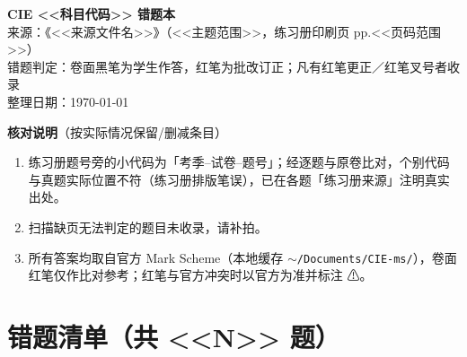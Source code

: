 \documentclass[10.5pt]{article}
\makeatletter
\newcommand{\qcard}[2]{%
\par\vspace{2.5mm}\noindent
\begin{tcolorbox}[enhanced,colback=white,colframe=mainc!60!black,boxrule=0.8pt,arc=1.5mm,
  title={\bfseries #1},colbacktitle=mainc!12,coltitle=mainc!60!black,fonttitle=\normalsize,
  left=2mm,right=2mm,top=1.2mm,bottom=1.2mm]
\begin{tabular}{@{}>{\bfseries\color{gray!55!black}}p{23mm} p{\dimexpr\linewidth-23mm-2\tabcolsep\relax}@{}}
#2
\end{tabular}
\end{tcolorbox}}
\newcommand{\row}[2]{\textbf{#1：} & #2 \\}
\makeatother
\begin{document}
\pagestyle{fancy}\fancyhf{}
\fancyfoot[C]{\small\thepage}
\renewcommand{\headrulewidth}{0.4pt}

\begin{center}
  {\LARGE\bfseries\color{mainc} CIE <<科目代码>> 错题本}\\[2mm]
  {\small 来源：《<<来源文件名>>》（<<主题范围>>，练习册印刷页 pp.<<页码范围>>）\\[1mm]
  错题判定：卷面黑笔为学生作答，红笔为批改订正；凡有红笔更正／红笔叉号者收录\\[1mm]
  整理日期：\today}
\end{center}

\vspace{1mm}
\begin{tcolorbox}[enhanced,colback=accc!5,colframe=accc!60,boxrule=0.7pt,arc=1.2mm,left=2.5mm,right=2.5mm]
\textbf{核对说明}（按实际情况保留/删减条目）
\begin{enumerate}
  \item 练习册题号旁的小代码为「考季--试卷--题号」；经逐题与原卷比对，个别代码与真题实际位置不符（练习册排版笔误），已在各题「练习册来源」注明真实出处。
  \item 扫描缺页无法判定的题目未收录，请补拍。
  \item 所有答案均取自官方 Mark Scheme（本地缓存 \texttt{$\sim$/Documents/CIE-ms/}），卷面红笔仅作比对参考；红笔与官方冲突时以官方为准并标注 ⚠。
\end{enumerate}
\end{tcolorbox}

\section*{错题清单（共 <<N>> 题）}

\end{document}
